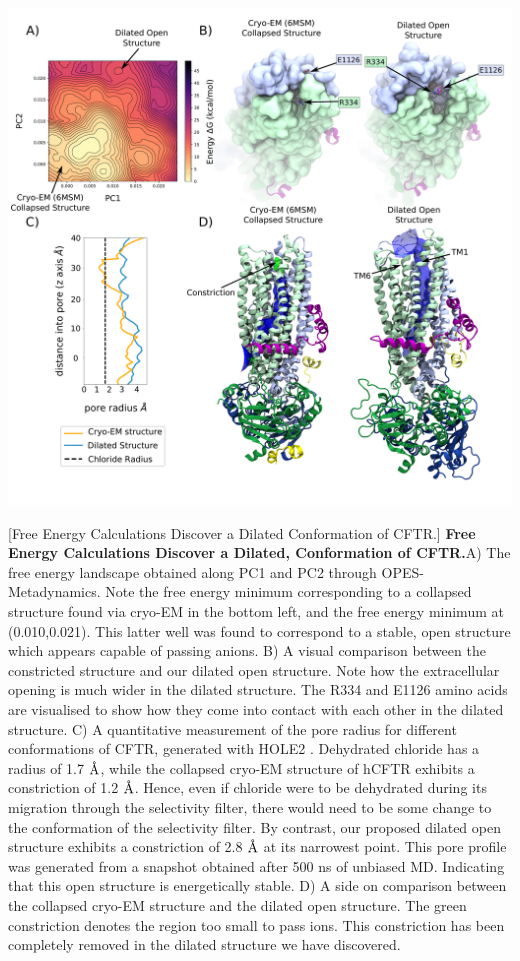 	\begin{center}
		\includegraphics[width=1\textwidth]{figures/opening/summary_dilated_structure_1.pdf}
	\end{center}
	\begingroup
	\captionsetup{singlelinecheck = false, justification=raggedright}
	[Free Energy Calculations Discover a Dilated Conformation of CFTR.] {\textbf{Free Energy Calculations Discover a Dilated, Conformation of CFTR.}}{A) The free energy landscape obtained along PC1 and PC2 through OPES-Metadynamics. Note the free energy minimum corresponding to a collapsed structure found via cryo-EM in the bottom left, and the free energy minimum at (0.010,0.021). This latter well was found to correspond to a stable, open structure which appears capable of passing anions. B) A visual comparison between the constricted structure and our dilated open structure. Note how the extracellular opening is much wider in the dilated structure. The R334 and E1126 amino acids are visualised to show how they come into contact with each other in the dilated structure. C) A quantitative measurement of the pore radius for different conformations of CFTR, generated with HOLE2 \cite{smart1996}. Dehydrated chloride has a radius of 1.7 $\textup{\AA}$, while the collapsed cryo-EM structure of hCFTR exhibits a constriction of 1.2 $\textup{\AA}$. Hence, even if chloride were to be dehydrated during its migration through the selectivity filter, there would need to be some change to the conformation of the selectivity filter. By contrast, our proposed dilated open structure exhibits a constriction of 2.8 $\textup{\AA}$ at its  narrowest point. This pore profile was generated from a snapshot obtained after 500 ns of unbiased MD. Indicating that this open structure is energetically stable.  D) A side on comparison between the collapsed cryo-EM structure and the dilated open structure. The green constriction denotes the region too small to pass ions. This constriction has been completely removed in the dilated structure we have discovered. }
	\label{summary_FES}
	\endgroup


